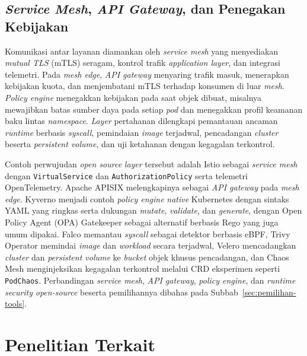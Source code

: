 \subsection{\textit{Service Mesh}, \textit{API Gateway}, dan Penegakan Kebijakan}
\label{subsec:mesh-kebijakan}

Komunikasi antar layanan diamankan oleh \textit{service mesh} yang menyediakan \textit{mutual TLS} (mTLS) seragam, kontrol trafik \textit{application layer}, dan integrasi telemetri. Pada \textit{mesh edge}, \textit{API gateway} menyaring trafik masuk, menerapkan kebijakan kuota, dan menjembatani mTLS terhadap konsumen di luar \textit{mesh}. \textit{Policy engine} menegakkan kebijakan pada saat objek dibuat, misalnya mewajibkan batas sumber daya pada setiap \textit{pod} dan menegakkan profil keamanan baku lintas \textit{namespace}. \textit{Layer} pertahanan dilengkapi pemantauan ancaman \textit{runtime} berbasis \textit{syscall}, pemindaian \textit{image} terjadwal, pencadangan \textit{cluster} beserta \textit{persistent volume}, dan uji ketahanan dengan kegagalan terkontrol.

Contoh perwujudan \textit{open source} \textit{layer} tersebut adalah Istio \autocite{istio2024} sebagai \textit{service mesh} dengan \texttt{VirtualService} dan \texttt{AuthorizationPolicy} serta telemetri OpenTelemetry. Apache APISIX \autocite{apisix2025} melengkapinya sebagai \textit{API gateway} pada \textit{mesh edge}. Kyverno \autocite{kyverno2024} menjadi contoh \textit{policy engine} \textit{native} Kubernetes dengan sintaks YAML yang ringkas serta dukungan \textit{mutate}, \textit{validate}, dan \textit{generate}, dengan Open Policy Agent (OPA) Gatekeeper \autocite{opa2024} sebagai alternatif berbasis Rego yang juga umum dipakai. Falco \autocite{falco2025} memantau \textit{syscall} sebagai detektor berbasis eBPF, Trivy Operator \autocite{trivy2025} memindai \textit{image} dan \textit{workload} secara terjadwal, Velero \autocite{velero2025} mencadangkan \textit{cluster} dan \textit{persistent volume} ke \textit{bucket} objek khusus pencadangan, dan Chaos Mesh \autocite{chaosmesh2025} menginjeksikan kegagalan terkontrol melalui CRD eksperimen seperti \texttt{PodChaos}. Perbandingan \textit{service mesh}, \textit{API gateway}, \textit{policy engine}, dan \textit{runtime security} \textit{open-source} beserta pemilihannya dibahas pada Subbab~\ref{sec:pemilihan-tools}.


\section{Penelitian Terkait}
\label{sec:terkait}

